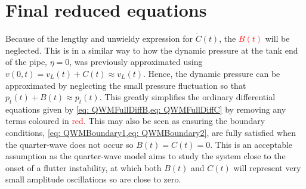 




%

\section{Final reduced equations} \label{subsec: QWMFinalDimensional}


Because of the lengthy and unwieldy expression for $\dot{C}(t)$, the \textcolor{Red}{$B(t)$} will be neglected. This is in a similar way to how the dynamic pressure at the tank end of the pipe, $\eta = 0$, was previously approximated using $v(0,t) = v_L(t) + C(t) \approx v_L(t)$. Hence, the dynamic pressure can be approximated by neglecting the small pressure fluctuation so that $p_t(t) + B(t) \approx p_t(t)$. This greatly simplifies the ordinary differential equations given by \cref{eq: QWMFullDiffB,eq: QWMFullDiffC} by removing any terms coloured in \textcolor{Red}{red}. This may also be seen as ensuring the boundary conditions, \cref{eq: QWMBoundary1,eq: QWMBoundary2}, are fully satisfied when the quarter-wave does not occur so $B(t) = C(t) = 0$. This is an acceptable assumption as the quarter-wave model aims to study the system close to the onset of a flutter instability, at which both $B(t)$ and $C(t)$ will represent very small amplitude oscillations so are close to zero.

